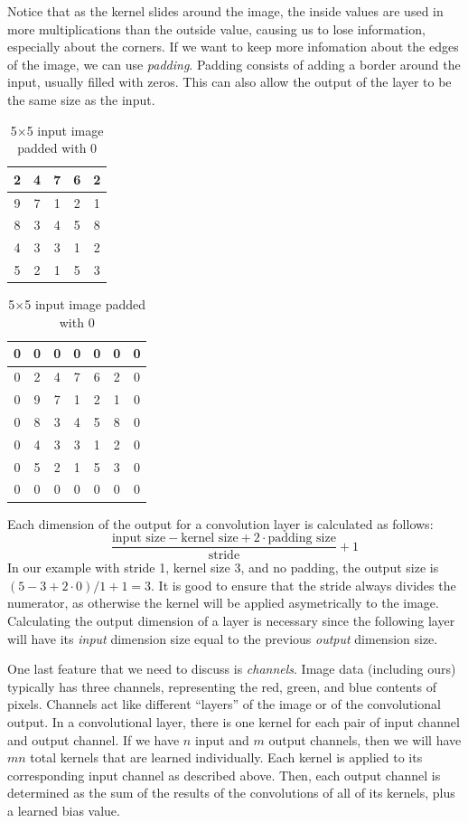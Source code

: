Notice that as the kernel slides around the image, the inside values are used in more multiplications than the outside value, causing us to lose information, especially about the corners.
If we want to keep more infomation about the edges of the image, we can use \emph{padding}.
Padding consists of adding a border around the input, usually filled with zeros.
This can also allow the output of the layer to be the same size as the input.
\begin{table}[H]
\parbox{.45\linewidth}{
\centering
\begin{tabular}{|c|c|c|c|c|}
\hline
2 & 4 & 7 & 6 & 2\\
\hline
9 & 7 & 1 & 2 & 1\\
\hline
8 & 3 & 4 & 5 & 8\\
\hline
4 & 3 & 3 & 1 & 2\\
\hline
5 & 2 & 1 & 5 & 3\\
\hline
\end{tabular}
\caption*{5$\times$5 input image}
}
\hfill
\parbox{.45\linewidth}{
\centering
\begin{tabular}{|c|c|c|c|c|c|c|}
\hline
0 & 0 & 0 & 0 & 0 & 0 & 0\\
\hline
0 & 2 & 4 & 7 & 6 & 2 & 0\\
\hline
0 & 9 & 7 & 1 & 2 & 1 & 0\\
\hline
0 & 8 & 3 & 4 & 5 & 8 & 0\\
\hline
0 & 4 & 3 & 3 & 1 & 2 & 0\\
\hline
0 & 5 & 2 & 1 & 5 & 3 & 0\\
\hline
0 & 0 & 0 & 0 & 0 & 0 & 0\\
\hline
\end{tabular}
\caption*{5$\times$5 input image padded with 0}
}
\end{table}


Each dimension of the output for a convolution layer is calculated as follows:
\[
\frac{\text{input size} - \text{kernel size} + 2\cdot \text{padding size}}{\text{stride}} + 1
\]
In our example with stride 1, kernel size 3, and no padding, the output size is $(5-3+2\cdot0)/1+1 = 3$.
It is good to ensure that the stride always divides the numerator, as otherwise the kernel will be applied asymetrically to the image.
Calculating the output dimension of a layer is necessary since the following layer will have its \emph{input} dimension size equal to the previous \emph{output} dimension size.

One last feature that we need to discuss is \emph{channels}.
Image data (including ours) typically has three channels, representing the red, green, and blue contents of pixels.
Channels act like different ``layers'' of the image or of the convolutional output.
In a convolutional layer, there is one kernel for each pair of input channel and output channel.
If we have \(n\) input and \(m\) output channels, then we will have \(mn\) total kernels that are learned individually.
Each kernel is applied to its corresponding input channel as described above.
Then, each output channel is determined as the sum of the results of the convolutions of all of its kernels, plus a learned bias value.

